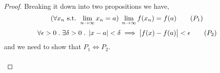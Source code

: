 \documentclass[../MathsNotesBase.tex]{subfiles}
\begin{document}
	\begin{proof}
		Breaking it down into two propositions we have,
		\begin{equation}
			(\forall x_n \text{ s.t. } \lim_{n \to \infty} x_n = a) \; \lim_{n \to \infty} f(x_n) = f(a) \tag{$P_1$}
		\end{equation}
		\begin{equation}
			\forall \epsilon > 0 \;.\; \exists \delta > 0 \;.\; \left\lvert x - a\right\rvert < \delta \implies \left\lvert f(x) - f(a)\right\rvert < \epsilon \tag{$P_2$}
		\end{equation}
		and we need to show that ${ P_1 \iff P_2. }$\\\\
		
		
		

\end{proof}
\end{document}
